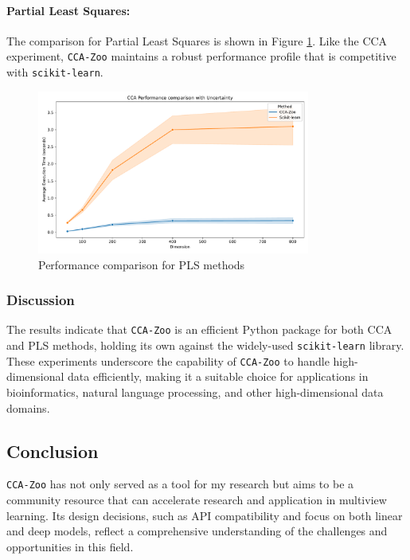 \paragraph{Partial Least Squares:}
The comparison for Partial Least Squares is shown in Figure \ref{fig:pls_benchmark}.
Like the CCA experiment, \texttt{CCA-Zoo} maintains a robust performance profile that is competitive with \texttt{scikit-learn}.

\begin{figure}[h]
    \centering
    \includegraphics[width=0.8\textwidth]{figures/CCA_Speed_Benchmark}
    \caption{Performance comparison for PLS methods}
    \label{fig:pls_benchmark}
\end{figure}

\subsubsection{Discussion}

The results indicate that \texttt{CCA-Zoo} is an efficient Python package for both CCA and PLS methods, holding its own against the widely-used \texttt{scikit-learn} library.
These experiments underscore the capability of \texttt{CCA-Zoo} to handle high-dimensional data efficiently, making it a suitable choice for applications in bioinformatics, natural language processing, and other high-dimensional data domains.

\subsection{Conclusion}

\texttt{CCA-Zoo} has not only served as a tool for my research but aims to be a community resource that can accelerate research and application in multiview learning.
Its design decisions, such as API compatibility and focus on both linear and deep models, reflect a comprehensive understanding of the challenges and opportunities in this field.

